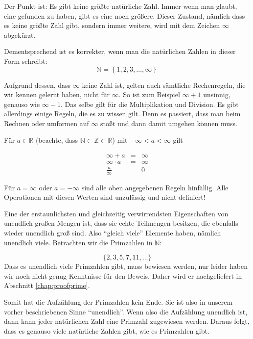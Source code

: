 Der Punkt ist: Es gibt keine größte natürliche Zahl. Immer wenn man glaubt, eine gefunden zu haben, gibt es eine noch größere. Dieser Zustand, nämlich dass es keine größte Zahl gibt, sondern immer weitere, wird mit dem Zeichen $\infty$ abgekürzt. 

Dementsprechend ist es korrekter, wenn man die natürlichen Zahlen in dieser Form schreibt:
\[
\mathbb{N} = \left\lbrace 1,2,3, \dots, \infty \right\rbrace
\]

Aufgrund dessen, dass $\infty$ keine Zahl ist, gelten auch sämtliche Rechenregeln, die wir kennen gelernt haben, nicht für $\infty$. So ist zum Beispiel $\infty +1$ unsinnig, genauso wie $\infty-1$. Das selbe gilt für die Multiplikation und Division. Es gibt allerdings einige Regeln, die es zu wissen gilt. Denn es passiert, dass man beim Rechnen oder umformen auf $\infty$ stößt und dann damit umgehen können muss. 

Für $a\in \mathbb{R}$ (beachte, dass $\mathbb{N} \subset \mathbb{Z} \subset \mathbb{R}$) mit $-\infty < a < \infty$ gilt

\begin{eqnarray*}
\infty + a &=& \infty \\
\infty \cdot a &=& \infty \\
\frac{a}{\infty} &=& 0
\end{eqnarray*}

Für $a=\infty$ oder $a=-\infty$ sind alle oben angegebenen Regeln hinfällig. Alle Operationen mit diesen Werten sind unzulässig und nicht definiert!

Eine der erstaunlichsten und gleichzeitig verwirrendsten Eigenschaften von unendlich großen Mengen ist, dass sie echte Teilmengen besitzen, die ebenfalls wieder unendlich groß sind. Also "`gleich viele"' Elemente haben, nämlich unendlich viele. Betrachten wir die Primzahlen in $\mathbb{N}$:

\begin{equation*}
\lbrace 2,3,5,7,11, \dots \rbrace
\end{equation*}
Dass es unendlich viele Primzahlen gibt, muss bewiesen werden, nur leider haben wir noch nicht genug Kenntnisse für den Beweis. Daher wird er nachgeliefert in Abschnitt \ref{chap:proofprime}. 

Somit hat die Aufzählung der Primzahlen kein Ende. Sie ist also in unserem vorher beschriebenen Sinne "`unendlich"'. Wenn also die Aufzählung unendlich ist, dann kann jeder natürlichen Zahl eine Primzahl zugewiesen werden. Daraus folgt, dass es genauso viele natürliche Zahlen gibt, wie es Primzahlen gibt. 

